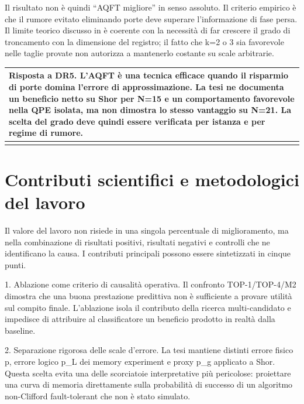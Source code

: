 Il risultato non è quindi ``AQFT migliore'' in senso assoluto. Il criterio empirico è che il rumore evitato eliminando porte deve superare l'informazione di fase persa. Il limite teorico discusso in \cite{barencoAQFT1996,akoramurthy2026} è coerente con la necessità di far crescere il grado di troncamento con la dimensione del registro; il fatto che k=2 o 3 sia favorevole nelle taglie provate non autorizza a mantenerlo costante su scale arbitrarie.

{\def\LTcaptype{none} %
\begin{longtable}[]{@{}
  >{\raggedright\arraybackslash}p{}@{}}
\toprule\noalign{}
\begin{minipage}[b]{\linewidth}\raggedright
\textbf{Risposta a DR5.} L'AQFT è una tecnica efficace quando il risparmio di porte domina l'errore di approssimazione. La tesi ne documenta un beneficio netto su Shor per N=15 e un comportamento favorevole nella QPE isolata, ma non dimostra lo stesso vantaggio su N=21. La scelta del grado deve quindi essere verificata per istanza e per regime di rumore.
\end{minipage} \\
\midrule\noalign{}
\endhead
\bottomrule\noalign{}
\endlastfoot
\end{longtable}
}

\section{Contributi scientifici e metodologici del lavoro}\label{sec:finale_6_2}

Il valore del lavoro non risiede in una singola percentuale di miglioramento, ma nella combinazione di risultati positivi, risultati negativi e controlli che ne identificano la causa. I contributi principali possono essere sintetizzati in cinque punti.

1. Ablazione come criterio di causalità operativa. Il confronto TOP-1/TOP-4/M2 dimostra che una buona prestazione predittiva non è sufficiente a provare utilità sul compito finale. L'ablazione isola il contributo della ricerca multi-candidato e impedisce di attribuire al classificatore un beneficio prodotto in realtà dalla baseline.

2. Separazione rigorosa delle scale d'errore. La tesi mantiene distinti errore fisico p, errore logico p\_L dei memory experiment e proxy p\_g applicato a Shor. Questa scelta evita una delle scorciatoie interpretative più pericolose: proiettare una curva di memoria direttamente sulla probabilità di successo di un algoritmo non-Clifford fault-tolerant che non è stato simulato.

